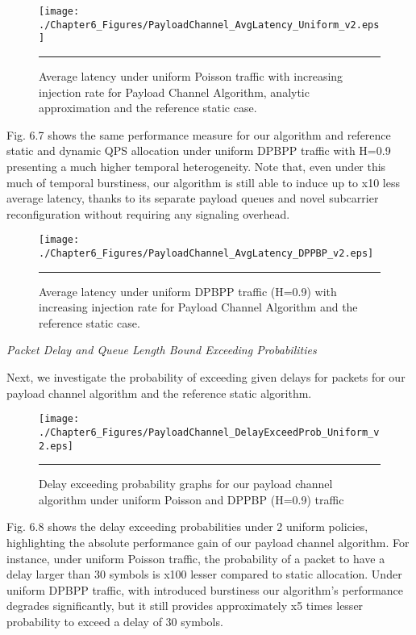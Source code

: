 \begin{figure}[htbp]
  \centering
    \texttt{[image: ./Chapter6\_Figures/PayloadChannel\_AvgLatency\_Uniform\_v2.eps]}
    \rule{35em}{0.5pt}
  \caption[Payload Channel Average latency under uniform Poisson]{Average latency under uniform Poisson traffic with increasing injection rate for Payload Channel Algorithm, analytic approximation and the reference static case.}
  \label{fig:Electron}
\end{figure}

Fig. 6.7 shows the same performance measure for our algorithm and reference static and dynamic QPS allocation under uniform DPBPP traffic with H=0.9 presenting a much higher temporal heterogeneity. Note that, even under this much of temporal burstiness, our algorithm is still able to induce up to x10 less average latency, thanks to its separate payload queues and novel subcarrier reconfiguration without requiring any signaling overhead. 

\begin{figure}[htbp]
  \centering
    \texttt{[image: ./Chapter6\_Figures/PayloadChannel\_AvgLatency\_DPPBP\_v2.eps]}
    \rule{35em}{0.5pt}
  \caption[Payload Channel Average latency under uniform DPBPP traffic (H=0.9) ]{Average latency under uniform DPBPP traffic (H=0.9) with increasing injection rate for Payload Channel Algorithm and the reference static case.}
  \label{fig:Electron}
\end{figure}

\textit{Packet Delay and Queue Length Bound Exceeding Probabilities}


Next, we investigate the probability of exceeding given delays for packets for our payload channel algorithm and the reference static algorithm. 

\begin{figure}[htbp]
  \centering
    \texttt{[image: ./Chapter6\_Figures/PayloadChannel\_DelayExceedProb\_Uniform\_v2.eps]}
    \rule{35em}{0.5pt}
  \caption[Delay exceeding probability graphs for our payload channel algorithm under uniform traffic]{Delay exceeding probability graphs for our payload channel algorithm under uniform Poisson and DPPBP (H=0.9) traffic}
  \label{fig:Electron}
\end{figure}

Fig. 6.8 shows the delay exceeding probabilities under 2 uniform policies, highlighting the absolute performance gain of our payload channel algorithm. For instance, under uniform Poisson traffic, the probability of a packet to have a delay larger than 30 symbols is x100 lesser compared to static allocation. Under uniform DPBPP traffic, with introduced burstiness our algorithm's performance degrades significantly, but it still provides approximately x5 times lesser probability to exceed a delay of 30 symbols. 


